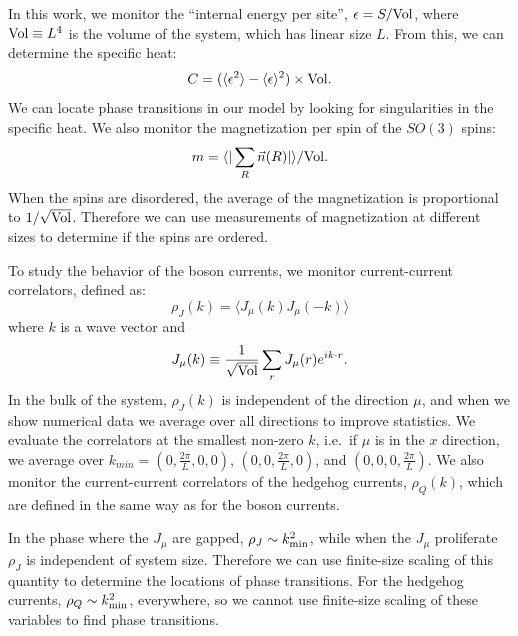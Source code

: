 \documentclass[prb,twocolumn]{revtex4-1}
\def\ra{\rangle} %
\def\la{\langle} %
\begin{document}
In this work, we monitor the ``internal energy per site'', $\epsilon= S /{\rm Vol}$, where ${\rm Vol}\equiv L^4$ is the volume of the system, which has linear size $L$. From this, we can determine the specific heat:
\begin{equation}
C=(\la \epsilon^2\ra-\la\epsilon\ra^2)\times{\rm Vol}.
\end{equation}
We can locate phase transitions in our model by looking for singularities in the specific heat. We also monitor the magnetization per spin of the $SO(3)$ spins:
\begin{equation}
m=\la |\sum_R \vec{n}(R)|\ra/{\rm Vol}.
\end{equation}
When the spins are disordered, the average of the magnetization is proportional to $1/\sqrt{\rm Vol}$. Therefore we can use measurements of magnetization at different sizes to determine if the spins are ordered.

To study the behavior of the boson currents, we monitor current-current correlators, defined as:
\begin{equation}
\rho_J({k})=\la J_\mu({k})J_\mu(-{k})\ra
\end{equation}
where $k$ is a wave vector and 
\begin{equation}
J_\mu({k})\equiv\frac{1}{\rm \sqrt{Vol}}\sum_r J_\mu(r)e^{i{k}\cdot r}.
\end{equation}
In the bulk of the system, $\rho_J({k})$ is independent of the direction $\mu$, and when we show numerical data we average over all directions to improve statistics. We evaluate the correlators at the smallest non-zero ${k}$, i.e.~if $\mu$ is in the $x$ direction, we average over ${k}_{min}=(0,\frac{2\pi}{L},0,0)$, $(0,0,\frac{2\pi}{L},0)$, and $(0,0,0,\frac{2\pi}{L})$. We also monitor the current-current correlators of the hedgehog currents, $\rho_Q(k)$, which are defined in the same way as for the boson currents.

In the phase where the $J_\mu$ are gapped, $\rho_J\sim {k}_{\rm min}^2$, while when the $J_\mu$ proliferate $\rho_J$ is independent of system size. Therefore we can use finite-size scaling of this quantity to determine the locations of phase transitions. For the hedgehog currents, $\rho_Q\sim {k}_{\rm min}^2$, everywhere, so we cannot use finite-size scaling of these variables to find phase transitions. 
\end{document}
